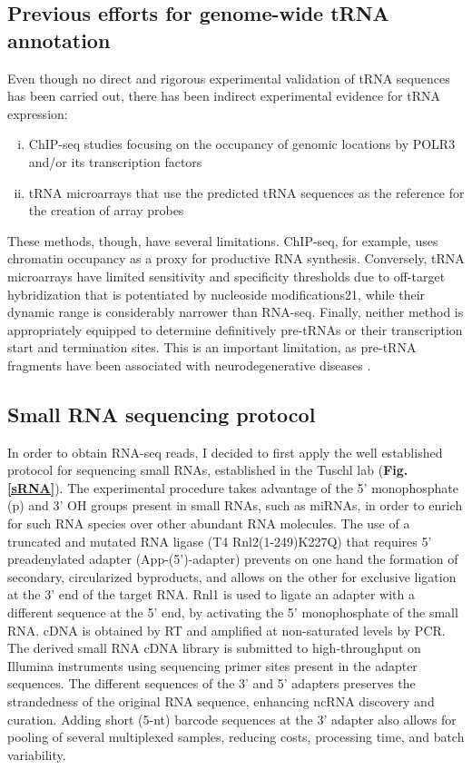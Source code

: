 \documentclass[12pt]{rockefeller}
\begin{document}
\subsection{Previous efforts for genome-wide tRNA annotation}

Even though no direct and rigorous experimental validation of tRNA sequences has been carried out, there has been indirect experimental evidence for tRNA expression:

\begin{enumerate}[i)]
\item ChIP-seq studies focusing on the occupancy of genomic locations by POLR3 and/or its transcription factors \cite{Moqtaderi:2010hc,Oler:2010fb,Kutter:2011ff}
\item tRNA microarrays that use the predicted tRNA sequences as the reference for the creation of array probes \cite{Dittmar:2004fb}
\end{enumerate}

These methods, though, have several limitations. ChIP-seq, for example, uses chromatin occupancy as a proxy for productive RNA synthesis. Conversely, tRNA microarrays have limited sensitivity and specificity thresholds due to off-target hybridization that is potentiated by nucleoside modifications21, while their dynamic range is considerably narrower than RNA-seq. Finally, neither method is appropriately equipped to determine definitively pre-tRNAs or their transcription start and termination sites. This is an important limitation, as pre-tRNA fragments have been associated with neurodegenerative diseases \cite{Hanada:2013bk, Weitzer:2014bi, Karaca:2014em}. 
	
\subsection{Small RNA sequencing protocol}
In order to obtain RNA-seq reads, I decided to first apply the well established protocol for sequencing small RNAs, established in the Tuschl lab \cite{Hafner:2012eaa} (\textbf{Fig. \ref{sRNA}}). The experimental procedure takes advantage of the 5' monophosphate (p) and 3' OH groups present in small RNAs, such as \glspl{miRNA}, in order to enrich for such RNA species over other abundant RNA molecules. The use of a truncated and mutated RNA ligase (T4 Rnl2(1-249)K227Q) that requires 5' preadenylated adapter (App-(5')-adapter) prevents on one hand the formation of secondary, circularized byproducts, and allows on the other for exclusive ligation at the 3' end of the target RNA. Rnl1 is used to ligate an adapter with a different sequence at the 5' end, by activating the 5' monophosphate of the small RNA. cDNA is obtained by RT and amplified at non-saturated levels by PCR. The derived small RNA cDNA library is submitted to high-throughput on Illumina instruments using sequencing primer sites present in the adapter sequences. The different sequences of the 3' and 5' adapters preserves the strandedness of the original RNA sequence, enhancing ncRNA discovery and curation. Adding short (5-nt) barcode sequences at the 3' adapter also allows for pooling of several multiplexed samples, reducing costs, processing time, and batch variability. 
\end{document}
